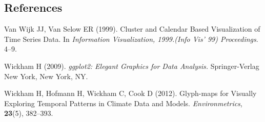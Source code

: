 \documentclass[12pt]{article}
\begin{document}
%        
%
%        

\subsection*{References}

\begin{description}

\item
Van Wijk JJ, Van Selow ER (1999). 
Cluster and Calendar Based Visualization of Time Series Data. 
In \textit{Information Visualization, 1999.(Info Vis’ 99) Proceedings}. 
4--9.

\item
Wickham H (2009).
\textit{ggplot2: Elegant Graphics for Data Analysis.}
Springer-Verlag New York, New York, NY.

\item
Wickham H, Hofmann H, Wickham C, Cook D (2012).
Glyph-maps for Visually Exploring Temporal Patterns in Climate Data and Models.
\textit{Environmetrics},
\textbf{23}(5), 382--393.

\end{description}
\end{document}
